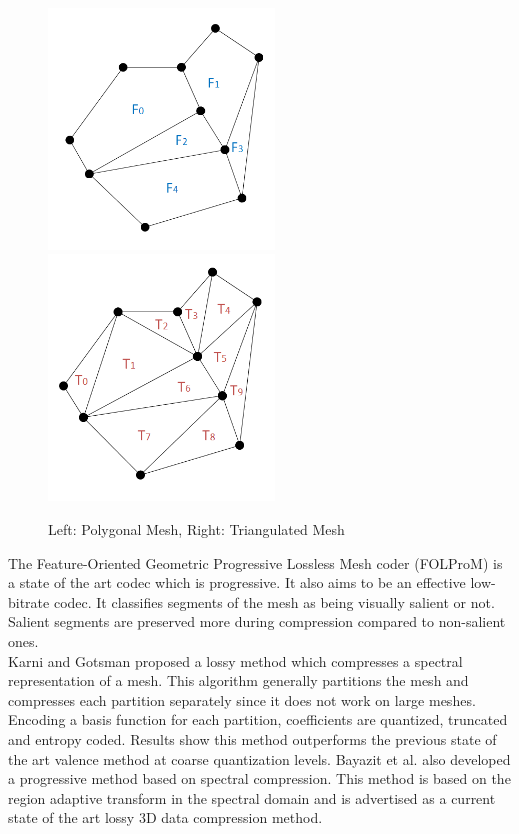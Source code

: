 \begin{figure}[!htb]
\centering
\includegraphics[width=6cm]{images/ch2/PolygonMeshExample}
\includegraphics[width=6cm]{images/ch2/TriangleMeshExample}
\caption{Left: Polygonal Mesh, Right: Triangulated Mesh}
\label{MeshExamples}
\end{figure}


The Feature-Oriented Geometric Progressive Lossless Mesh coder (FOLProM) \cite{Peng10Feature} is a state of the art codec which is progressive. It also aims to be an effective low-bitrate codec. It classifies segments of the mesh as being visually salient or not. Salient segments are preserved more during compression compared to non-salient ones. \\

Karni and Gotsman \cite{Karni00Spectral} proposed a lossy method which compresses a spectral representation of a mesh. This algorithm generally partitions the mesh and compresses each partition separately since it does not work on large meshes. Encoding a basis function for each partition, coefficients are quantized, truncated and entropy coded. Results show this method outperforms the previous state of the art valence method \cite{touma98triangle} at coarse quantization levels. Bayazit et al. \cite{Bayazit103DMesh} also developed a progressive method based on spectral compression. This method is based on the region adaptive transform in the spectral domain and is advertised as a current state of the art lossy 3D data compression method. \\

